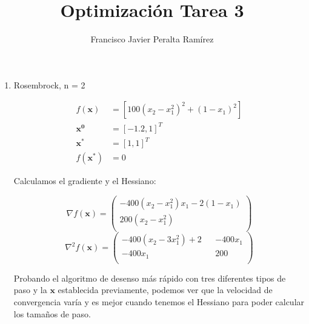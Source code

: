 \documentclass{article}
\title {Optimización Tarea 3}
\author {Francisco Javier Peralta Ramírez}
\date{\vspace{-2ex}}
\begin{document}
\maketitle
\begin{enumerate}
\item Rosembrock, n = 2

\begin{align*} 
f(\boldsymbol{x}) &= [100 (x_2 - x_1^2)^2 + (1 - x_1)^2] \\
\boldsymbol{x^0} &= [-1.2, 1]^T \\
\boldsymbol{x^*} &= [1, 1]^T \\
f(\boldsymbol{x^*}) &= 0
\end{align*}

Calculamos el gradiente y el Hessiano:

$$\nabla f(\boldsymbol{x}) = 
 \begin{pmatrix}
  -400(x_2 - x_1^2)x_1 - 2(1 - x_1) \\
  200(x_2 - x_1^2)\\
 \end{pmatrix}$$
$$
\nabla^2f(\boldsymbol{x})= 
 \begin{pmatrix}
  -400(x_2 - 3x_1^2) + 2 && -400x_1\\
  -400x_1 && 200\\
 \end{pmatrix}
$$

Probando el algoritmo de desenso más rápido con tres diferentes tipos de paso y la $\boldsymbol{x}$ establecida previamente, podemos ver que la velocidad de convergencia varía y es mejor cuando tenemos el Hessiano para poder calcular los tamaños de paso.


\end{enumerate}
\end{document}

